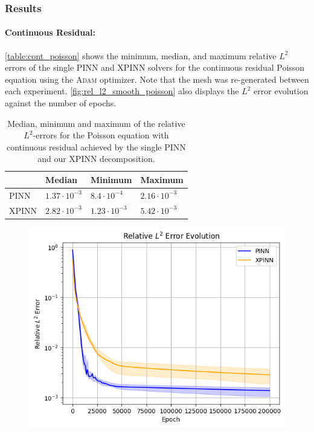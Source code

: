 \subsubsection{Results}
\paragraph{Continuous Residual:}
\autoref{table:cont_poisson} shows the minimum, median, and maximum relative $L^2$ errors of the single PINN and XPINN solvers for the continuous residual Poisson equation using the \textsc{Adam} optimizer. Note that the mesh was re-generated between each experiment. \autoref{fig:rel_l2_smooth_poisson} also displays the $L^2$ error evolution against the number of epochs.
\begin{table}[h]
\caption{Median, minimum and maximum of the relative $L^2$-errors for the Poisson equation with continuous residual achieved by the single PINN and our XPINN decomposition. }
    \centering
    \begin{tabular}{|l|l l l|}
    \hline
     & Median & Minimum & Maximum
    \\
    \hline
    PINN &$1.37\cdot 10^{-3}$ &  $8.4 \cdot 10^{-4}$&$2.16 \cdot 10^{-3}$ 
    \\
    XPINN &$2.82\cdot 10^{-3}$ &  $1.23 \cdot 10^{-3}$&$5.42 \cdot 10^{-3}$
    \\
    \hline
    \end{tabular}
    \label{table:cont_poisson}
\end{table}
\begin{figure}[h]
    \centering
    \includegraphics[width = \linewidth]{Project1XPINNs/figures/Poisson/Relative_L2_smooth_Adam.png}
    \caption{}
    \label{fig:rel_l2_smooth_poisson}
\end{figure}


